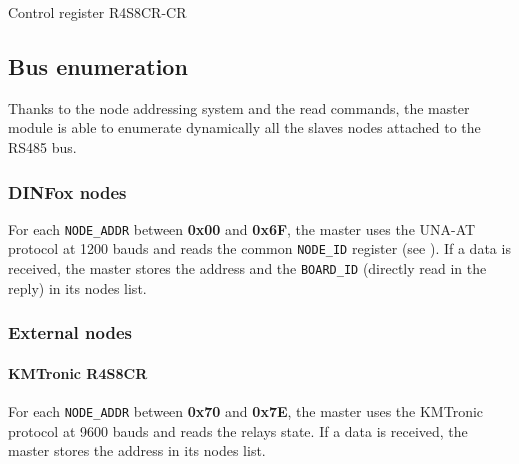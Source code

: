 {Control register}
{R4S8CR-CR}

\newpage

\subsection{Bus enumeration}

Thanks to the node addressing system and the read commands, the master module is able to enumerate dynamically all the slaves nodes attached to the RS485 bus.

\subsubsection{DINFox nodes}

For each \texttt{NODE\_ADDR} between \textbf{0x00} and \textbf{0x6F}, the master uses the UNA-AT protocol at 1200 bauds and reads the common \texttt{NODE\_ID} register (see ). If a data is received, the master stores the address and the \texttt{BOARD\_ID} (directly read in the reply) in its nodes list.

\subsubsection{External nodes}

\paragraph{KMTronic R4S8CR}

For each \texttt{NODE\_ADDR} between \textbf{0x70} and \textbf{0x7E}, the master uses the KMTronic protocol at 9600 bauds and reads the relays state. If a data is received, the master stores the address in its nodes list.

\newpage